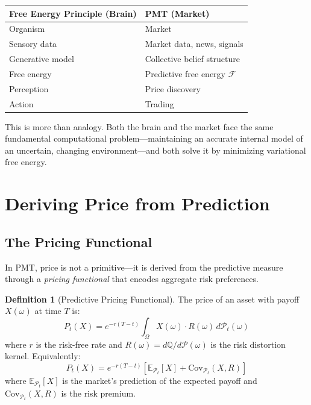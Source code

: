 \documentclass[12pt,a4paper]{article}
\theoremstyle{definition}
\newtheorem{definition}[theorem]{Definition}
\newcommand{\E}{\mathbb{E}}
\newcommand{\Q}{\mathbb{Q}}
\newcommand{\PP}{\mathcal{P}}
\newcommand{\Cov}{\mathrm{Cov}}
\begin{document}
\begin{center}
\begin{tabular}{ll}
\toprule
\textbf{Free Energy Principle (Brain)} & \textbf{PMT (Market)} \\
\midrule
Organism & Market \\
Sensory data & Market data, news, signals \\
Generative model & Collective belief structure \\
Free energy & Predictive free energy $\mathcal{F}$ \\
Perception & Price discovery \\
Action & Trading \\
\bottomrule
\end{tabular}
\end{center}

This is more than analogy. Both the brain and the market face the same fundamental computational problem---maintaining an accurate internal model of an uncertain, changing environment---and both solve it by minimizing variational free energy.



\section{Deriving Price from Prediction}\label{sec:pricing}

\subsection{The Pricing Functional}

In PMT, price is not a primitive---it is derived from the predictive measure through a \emph{pricing functional} that encodes aggregate risk preferences.

\begin{definition}[Predictive Pricing Functional]\label{def:pricing_functional}
The price of an asset with payoff $X(\omega)$ at time $T$ is:
\begin{equation}\label{eq:pricing_functional}
    P_t(X) = e^{-r(T-t)} \int_\Omega X(\omega) \cdot R(\omega) \, d\PP_t(\omega)
\end{equation}
where $r$ is the risk-free rate and $R(\omega) = d\Q/d\PP(\omega)$ is the risk distortion kernel. Equivalently:
\begin{equation}\label{eq:pricing_decomposed}
    P_t(X) = e^{-r(T-t)} \left[\E_{\PP_t}[X] + \Cov_{\PP_t}(X, R)\right]
\end{equation}
where $\E_{\PP_t}[X]$ is the market's prediction of the expected payoff and $\Cov_{\PP_t}(X, R)$ is the risk premium.
\end{definition}
\end{document}
